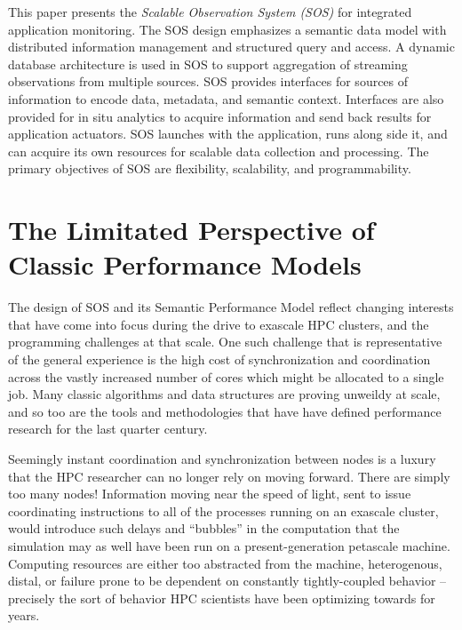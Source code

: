 This paper presents the \textit{Scalable Observation System (SOS)} for
integrated application monitoring.
%
The SOS design emphasizes a semantic data model with distributed
information management and structured query and access.
%
A dynamic database architecture is used in SOS to support aggregation
of streaming observations from multiple sources.
%
SOS provides interfaces for sources of information to encode data,
metadata, and semantic context.
%
Interfaces are also provided for in situ analytics to acquire
information and send back results for application actuators.
%
SOS launches with the application, runs along side it, and can acquire
its own resources for scalable data collection and processing.
%
The primary objectives of SOS are flexibility, scalability, and
programmability.


\section{The Limitated Perspective of Classic Performance Models}

The design of SOS and its Semantic Performance Model reflect changing
interests that have come into focus during the drive to exascale HPC
clusters, and the programming challenges at that scale.
%
One such challenge that is representative of the general experience is
the high cost of synchronization and coordination across the vastly
increased number of cores which might be allocated to a single
job.
%
Many classic algorithms and data structures are proving unweildy at
scale, and so too are the tools and methodologies that have have
defined performance research for the last quarter century.

Seemingly instant coordination and synchronization between nodes is a
luxury that the HPC researcher can no longer rely on moving
forward.
%
There are simply too many nodes! Information moving near the
speed of light, sent to issue coordinating instructions to all of the
processes running on an exascale cluster, would introduce such delays
and ``bubbles'' in the computation that the simulation may as well
have been run on a present-generation petascale machine.
%
Computing resources are either too abstracted from the machine,
heterogenous, distal, or failure prone to be dependent on constantly
tightly-coupled behavior -- precisely the sort of behavior HPC
scientists have been optimizing towards for years.

